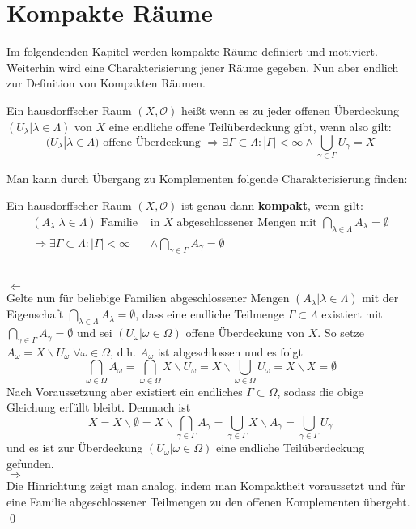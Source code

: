 \chapter{Kompakte Räume}
Im folgendenden Kapitel werden kompakte Räume definiert und motiviert. Weiterhin wird eine Charakterisierung jener Räume gegeben.
Nun aber endlich zur Definition von Kompakten Räumen.

\begin{Def}[Kompaktheit]
	Ein hausdorffscher Raum \((X, \mathcal{O})\) heißt  wenn es zu jeder offenen Überdeckung 
	\((U_{\lambda} | \lambda \in \Lambda)\) von \(X\) eine endliche offene Teilüberdeckung gibt, wenn also gilt:
	\[ (U_{\lambda} | \lambda \in \Lambda) \mbox{ offene Überdeckung }
     \Rightarrow \exists \Gamma \subset \Lambda : |\Gamma| < \infty \land \bigcup_{\gamma \in \Gamma} U_{\gamma} = X \] 
\end{Def}
Man kann durch Übergang zu Komplementen folgende Charakterisierung finden:

\begin{Satz}
	Ein hausdorffscher Raum \((X, \mathcal{O})\) ist genau dann \textbf{kompakt}, wenn gilt:
	\begin{align*}
		(A_{\lambda}| \lambda \in \Lambda) \mbox{ Familie } & \mbox{in } X \mbox{ abgeschlossener Mengen mit } 
		\bigcap_{\lambda \in \Lambda} A_{\lambda} = \emptyset \\
		\Rightarrow \exists \Gamma \subset \Lambda : |\Gamma| < \infty & \land \bigcap_{\gamma \in \Gamma} A_{\gamma} = \emptyset
	\end{align*} 
\end{Satz}
	\\
	\glqq\(\Leftarrow\)\grqq
	\\
	Gelte nun für beliebige Familien abgeschlossener Mengen \((A_{\lambda}| \lambda \in \Lambda)\) mit der Eigenschaft
	\(\bigcap_{\lambda \in \Lambda} A_{\lambda} = \emptyset\), dass eine endliche Teilmenge \(\Gamma \subset \Lambda\) existiert mit
	\(\bigcap_{\gamma \in \Gamma} A_{\gamma} = \emptyset\) und sei \( (U_{\omega} | \omega \in \Omega) \) offene Überdeckung
	von \(X\). So setze \(A_{\omega} = X \backslash U_{\omega} \; \forall \omega \in \Omega\), d.h. \(A_{\omega}\) ist abgeschlossen
	und es folgt 
	\[\bigcap_{\omega \in \Omega} A_{\omega} = \bigcap_{\omega \in \Omega} X \backslash U_{\omega} =  X \backslash 
	\bigcup_{\omega \in \Omega} U_{\omega} = X \backslash X =  \emptyset \]
	Nach Voraussetzung aber existiert ein endliches \(\Gamma \subset \Omega\), sodass die obige Gleichung erfüllt bleibt. Demnach ist 
	\[ X = X \backslash \emptyset = X \backslash \bigcap_{\gamma \in \Gamma} A_{\gamma} = \bigcup_{\gamma \in \Gamma} X \backslash A_{\gamma} = 
	\bigcup_{\gamma \in \Gamma} U_{\gamma} \] 
	und es ist zur Überdeckung \( (U_{\omega} | \omega \in \Omega) \) eine endliche Teilüberdeckung gefunden.
	\\
	\glqq\(\Rightarrow\)\grqq
	\\
	Die Hinrichtung zeigt man analog, indem man Kompaktheit voraussetzt und für eine Familie abgeschlossener Teilmengen zu den 
	offenen Komplementen übergeht.
\qed

